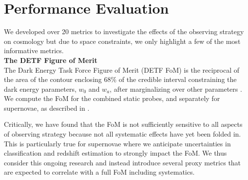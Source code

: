 \documentclass[12pt, letterpaper]{article}
\begin{document}
\section{Performance Evaluation}

We developed over 20 metrics to investigate the effects of the observing strategy on cosmology but due to space constraints, we only highlight a few of the most informative metrics. \\

{\bfseries The DETF Figure of Merit}\\
The Dark Energy Task Force Figure of Merit (DETF FoM) is %
the reciprocal of the area of the contour enclosing 68\% of the credible interval constraining the dark energy parameters, $w_0$ and $w_a$, after marginalizing over other parameters \cite{albrecht2006}. We compute the FoM for the combined static probes, %
and separately for supernovae,
%
as described in \cite{descsrd}.  

Critically, we have found that the FoM is not sufficiently sensitive to all aspects of observing strategy because not all systematic effects have yet been folded in. This is particularly true for supernovae where we anticipate uncertainties in classification and redshift estimation to strongly impact the FoM. We thus consider this ongoing research and instead introduce several proxy metrics that are expected to correlate with a full FoM including systematics.\\
\end{document}
